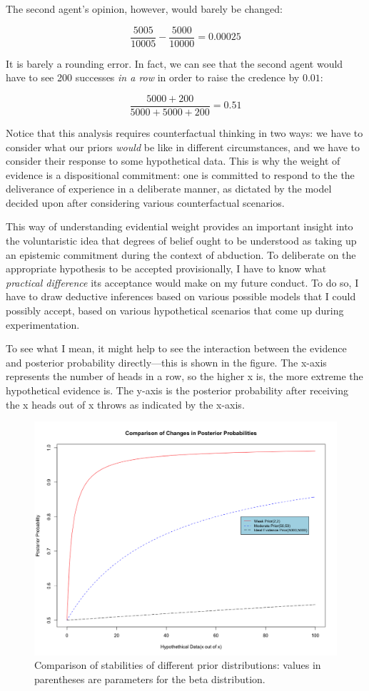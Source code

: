 The second agent's opinion, however, would barely be changed:

\[\frac{5005}{10005} - \frac{5000}{10000} = 0.00025\]

It is barely a rounding error. In fact, we can see that the second agent
would have to see 200 successes \emph{in a row} in order to raise the
credence by \(0.01\):

\[\frac{5000+200}{5000+5000+200} = 0.51\]

Notice that this analysis requires counterfactual thinking in two ways:
we have to consider what our priors \emph{would} be like in different
circumstances, and we have to consider their response to some hypothetical
data. This is why the weight of evidence is a dispositional commitment:
one is committed to respond to the the deliverance of experience in a
deliberate manner, as dictated by the model decided upon after
considering various counterfactual scenarios.

This way of understanding evidential weight provides an important
insight into the voluntaristic idea that degrees of belief ought to be
understood as taking up an epistemic commitment during the context of
abduction. To deliberate on the appropriate hypothesis to be accepted
provisionally, I have to know what \emph{practical difference} its
acceptance would make on my future conduct. To do so, I have to draw
deductive inferences based on various possible models that I could
possibly accept, based on various hypothetical scenarios that come up
during experimentation.

To see what I mean, it might help to see the interaction between the
evidence and posterior probability directly---this is shown in the
figure. The x-axis represents the number of heads in a row, so the
higher x is, the more extreme the hypothetical evidence is. The y-axis
is the posterior probability after receiving the x heads out of x throws
as indicated by the x-axis.

\begin{figure}
\centering
\includegraphics[scale=0.3]{rescompare}
\caption{Comparison of stabilities of different prior distributions:
values in parentheses are parameters for the beta distribution.}
\label{fig:res}
\end{figure}

